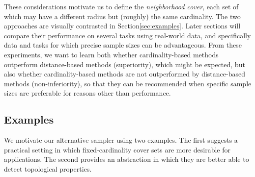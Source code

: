 \documentclass{article}
\begin{document}
These considerations motivate us to define the \emph{neighborhood
cover}, each set of which may have a different radius but (roughly) the
same cardinality. The two approaches are visually contrasted in
Section\nbs\ref{sec:examples}. Later sections will compare their
performance on several tasks using real-world data, and specifically
data and tasks for which precise sample sizes can be advantageous. From
these experiments, we want to learn both whether cardinality-based
methods outperform distance-based methods (superiority), which might be
expected, but also whether cardinality-based methods are not
outperformed by distance-based methods (non-inferiority), so that they
can be recommended when specific sample sizes are preferable for reasons
other than performance.

\hypertarget{examples}{%
\subsection{Examples}\label{examples}}

\label{sec:examples}

We motivate our alternative sampler using two examples. The first
suggests a practical setting in which fixed-cardinality cover sets are
more desirable for applications. The second provides an abstraction in
which they are better able to detect topological properties.
\end{document}
